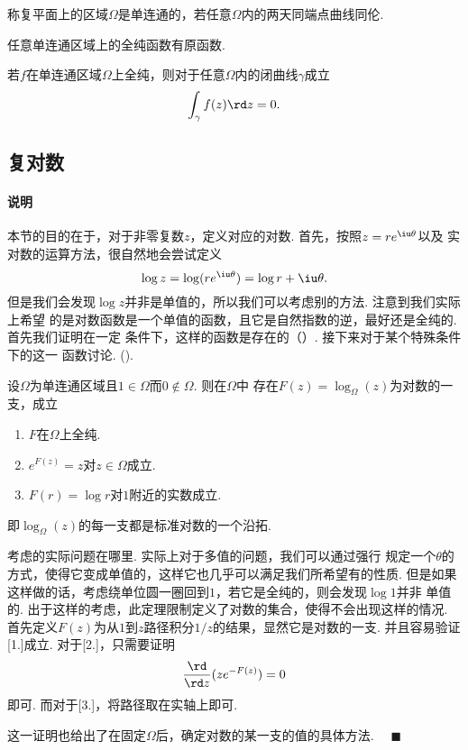   \begin{defi}[单连通]
    称复平面上的区域$\Omega$是单连通的，若任意$\Omega$内的两天同端点曲线同伦.
  \end{defi}

  \begin{thm}
    任意单连通区域上的全纯函数有原函数.
  \end{thm}

  \begin{thm}[Cauchy]
    若$f$在单连通区域$\Omega$上全纯，则对于任意$\Omega$内的闭曲线$\gamma$成立
    \[
      \int_\gamma f(z)\rd z = 0.
    \]
  \end{thm}


\subsection{复对数}
  \paragraph{说明}
    本节的目的在于，对于非零复数$z$，定义对应的对数. 首先，按照$z=re^{\iu\theta}$以及
    实对数的运算方法，很自然地会尝试定义
    \begin{equation}
      \label{equ: 复对数}
      \log z = \log(re^{\iu\theta}) = \log r + \iu\theta.
    \end{equation}
    但是我们会发现$\log z$并非是单值的，所以我们可以考虑别的方法. 注意到我们实际上希望
    的是对数函数是一个单值的函数，且它是自然指数的逆，最好还是全纯的. 首先我们证明在一定
    条件下，这样的函数是存在的（）. 接下来对于某个特殊条件下的这一
    函数讨论. ().

  \begin{thm}
    \label{thm: 复对数}
    设$\Omega$为单连通区域且$1\in\Omega$而$0\notin\Omega$. 则在$\Omega$中
    存在$F(z)=\log_{\Omega}(z)$为对数的一支，成立
    \begin{enumerate}
      \item $F$在$\Omega$上全纯.
      \item $e^{F(z)}=z$对$z\in\Omega$成立.
      \item $F(r)=\log r$对$1$附近的实数成立.
    \end{enumerate}
    即$\log_\Omega(z)$的每一支都是标准对数的一个沿拓.
  \end{thm}
  \remark
    考虑的实际问题在哪里. 实际上对于多值的问题，我们可以通过强行
    规定一个$\theta$的方式，使得它变成单值的，这样它也几乎可以满足我们所希望有的性质. 
    但是如果这样做的话，考虑绕单位圆一圈回到$1$，若它是全纯的，则会发现$\log 1$并非
    单值的. 出于这样的考虑，此定理限制定义了对数的集合，使得不会出现这样的情况.
  \proof
    首先定义$F(z)$为从$1$到$z$路径积分$1/z$的结果，显然它是对数的一支. 并且容易验证
    [1.]成立. 对于[2.]，只需要证明
    \[
      \frac{\rd}{\rd z}(ze^{-F(z)}) = 0
    \]
    即可. 而对于[3.]，将路径取在实轴上即可.\par
    这一证明也给出了在固定$\Omega$后，确定对数的某一支的值的具体方法. $\quad\blacksquare$

